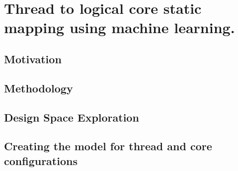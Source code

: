 %
%
%
%
%
%
%

\chapter{Thread to logical core static mapping using machine learning.}

\label{sec:intro}


%

\section{Motivation}
\label{sec:motiviation}


\section{Methodology}
\label{sec:setup}


\section{Design Space Exploration}
\label{sec:streamit:dse}


\section{Creating the model for thread and core configurations}
\label{sec:ml}



